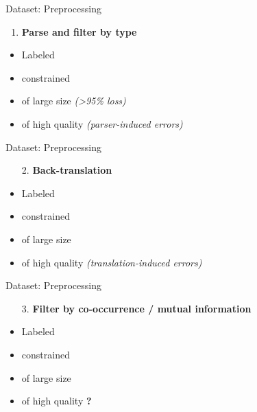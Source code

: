 \documentclass{beamer}
\newcommand{\xmark}{\ding{55}}
\begin{document}
\begin{frame}{Dataset: Preprocessing}

	\begin{enumerate}
	\item \textbf{Parse and filter by type}
	\end{enumerate}

	\begin{itemize}
	\item Labeled \textcolor{Yes}{\checkmark}
	\item constrained \textcolor{Yes}{\checkmark}
	\item of large size \textcolor{No}{\xmark} 
	\footnotesize\textit{(>95\% loss)} 
	\normalsize
	\item of high quality \textcolor{No}{\xmark}
	\footnotesize\textit{(parser-induced errors)} 
	\normalsize
	\end{itemize}
\end{frame}

\begin{frame}{Dataset: Preprocessing}

	\begin{enumerate}
	\item[2.] \textbf{Back-translation}
	\end{enumerate}

	\begin{itemize}
	\item Labeled \textcolor{Yes}{\checkmark}
	\item constrained \textcolor{Yes}{\checkmark}
	\item of large size \textcolor{Yes}{\checkmark}
	\item of high quality \textcolor{No}{\xmark}
	\footnotesize\textit{(translation-induced errors)}
	\normalsize
	\end{itemize}
\end{frame}

\begin{frame}{Dataset: Preprocessing}

	\begin{enumerate}
	\item[3.] \textbf{Filter by co-occurrence / mutual information}
	\end{enumerate}

	\begin{itemize}
	\item Labeled \textcolor{Yes}{\checkmark}
	\item constrained \textcolor{Yes}{\checkmark}
	\item of large size \textcolor{Yes}{\checkmark}
	\item of high quality \textcolor{Maybe}{\textbf{?}}
	\end{itemize}
\end{frame}
    
\end{document}
